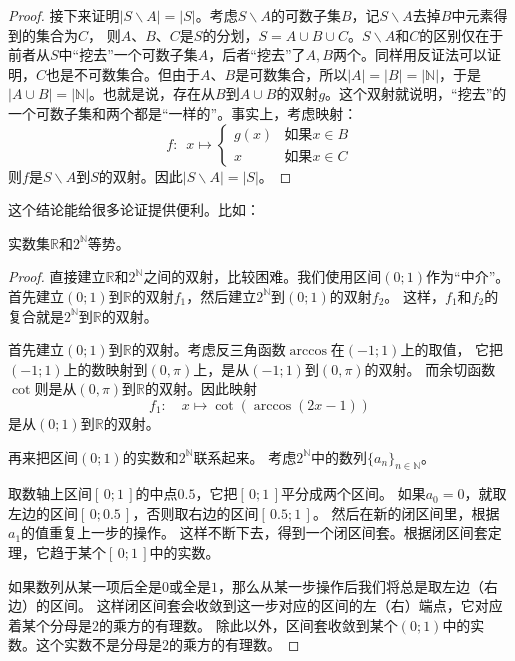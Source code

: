 \documentclass[12pt,UTF8]{ctexbook}
\begin{document}
\begin{appendix}
\begin{proof}
    接下来证明$|S\backslash A| = |S|$。考虑$S\backslash A$的可数子集$B$，记$S\backslash A$去掉$B$中元素得到的集合为$C$，
    则$A$、$B$、$C$是$S$的分划，$S = A\cup B\cup C$。$S\backslash A$和$C$的区别仅在于前者从$S$中“挖去”一个可数子集$A$，后者“挖去”了$A,B$两个。同样用反证法可以证明，$C$也是不可数集合。但由于$A$、$B$是可数集合，所以$ |A| = |B| = |\mathbb{N}|$，于是$|A\cup B| = |\mathbb{N}|$。也就是说，存在从$B$到$A\cup B$的双射$g$。这个双射就说明，“挖去”的一个可数子集和两个都是“一样的”。事实上，考虑映射：
    $$ f:\,\,\,x\mapsto \left\{
        \begin{array}{cl}
            g(x) & \mbox{如果}x\in B \\
            x & \mbox{如果}x \in C
        \end{array}\right.
    $$
    则$f$是$S\backslash A$到$S$的双射。因此$|S\backslash A| = |S|$。
\end{proof}

这个结论能给很多论证提供便利。比如：
\begin{tm}\label{tm:a-1-20}
    实数集$\mathbb{R}$和$2^\mathbb{N}$等势。
\end{tm}

\begin{proof}
    直接建立$\mathbb{R}$和$2^\mathbb{N}$之间的双射，比较困难。我们使用区间$(0;1)$作为“中介”。
    首先建立$(0;1)$到$\mathbb{R}$的双射$f_1$，然后建立$2^\mathbb{N}$到$(0;1)$的双射$f_2$。
    这样，$f_1$和$f_2$的复合就是$2^\mathbb{N}$到$\mathbb{R}$的双射。
    
    首先建立$(0;1)$到$\mathbb{R}$的双射。考虑反三角函数$\arccos$在$(-1;1)$上的取值，
    它把$(-1;1)$上的数映射到$(0,\pi)$上，是从$(-1;1)$到$(0,\pi)$的双射。
    而余切函数$\cot$则是从$(0,\pi)$到$\mathbb{R}$的双射。因此映射
    $$ f_1 :\quad x \mapsto \cot{\left(\arccos{(2x-1)}\right)} $$
    是从$(0;1)$到$\mathbb{R}$的双射。

    再来把区间$(0;1)$的实数和$2^\mathbb{N}$联系起来。
    考虑$2^\mathbb{N}$中的数列$\{a_n\}_{n\in\mathbb{N}}$。

    取数轴上区间$[\,0;1\,]$的中点$0.5$，它把$[\,0;1\,]$平分成两个区间。
    如果$a_0 = 0$，就取左边的区间$[\,0;0.5\,]$，否则取右边的区间$[\,0.5;1\,]$。
    然后在新的闭区间里，根据$a_1$的值重复上一步的操作。
    这样不断下去，得到一个闭区间套。根据闭区间套定理，它趋于某个$[\,0;1\,]$中的实数。

    如果数列从某一项后全是$0$或全是$1$，那么从某一步操作后我们将总是取左边（右边）的区间。
    这样闭区间套会收敛到这一步对应的区间的左（右）端点，它对应着某个分母是$2$的乘方的有理数。
    除此以外，区间套收敛到某个$(0;1)$中的实数。这个实数不是分母是$2$的乘方的有理数。


\end{proof}
\end{appendix}
\end{document}
